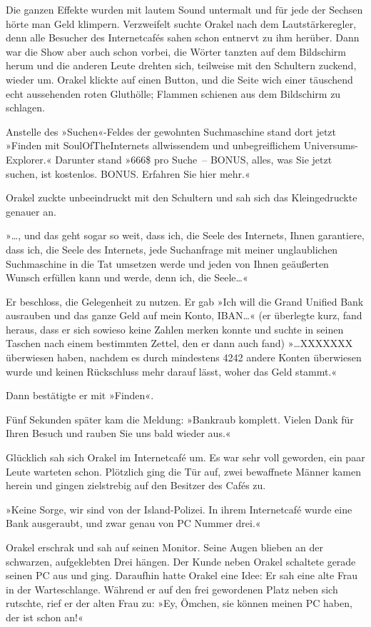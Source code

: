 Die ganzen Effekte wurden mit lautem Sound untermalt und für jede der Sechsen hörte man Geld klimpern. Verzweifelt suchte Orakel nach dem Lautstärkeregler, denn alle Besucher des Internetcafés sahen schon entnervt zu ihm herüber. Dann war die Show aber auch schon vorbei, die Wörter tanzten auf dem Bildschirm herum und die anderen Leute drehten sich, teilweise mit den Schultern zuckend, wieder um. Orakel klickte auf einen Button, und die Seite wich einer täuschend echt aussehenden roten Gluthölle; Flammen schienen aus dem Bildschirm zu schlagen.

Anstelle des »Suchen«-Feldes der gewohnten Suchmaschine stand dort jetzt »Finden mit SoulOfTheInternets allwissendem und unbegreiflichem Universums-Explorer.« Darunter stand »666\$ pro Suche~– BONUS, alles, was Sie jetzt suchen, ist kostenlos. BONUS. Erfahren Sie hier mehr.«

Orakel zuckte unbeeindruckt mit den Schultern und sah sich das Kleingedruckte genauer an.

»…, und das geht sogar so weit, dass ich, die Seele des Internets, Ihnen garantiere, dass ich, die Seele des Internets, jede Suchanfrage mit meiner unglaublichen Suchmaschine in die Tat umsetzen werde und jeden von Ihnen geäußerten Wunsch erfüllen kann und werde, denn ich, die Seele…«

Er beschloss, die Gelegenheit zu nutzen. Er gab »Ich will die Grand Unified Bank ausrauben und das ganze Geld auf mein Konto, IBAN…« (er überlegte kurz, fand heraus, dass er sich sowieso keine Zahlen merken konnte und suchte in seinen Taschen nach einem bestimmten Zettel, den er dann auch fand) »…XXXXXXX überwiesen haben, nachdem es durch mindestens 4242 andere Konten überwiesen wurde und keinen Rückschluss mehr darauf lässt, woher das Geld stammt.«

Dann bestätigte er mit »Finden«.

Fünf Sekunden später kam die Meldung: »Bankraub komplett. Vielen Dank für Ihren Besuch und rauben Sie uns bald wieder aus.«

Glücklich sah sich Orakel im Internetcafé um. Es war sehr voll geworden, ein paar Leute warteten schon. Plötzlich ging die Tür auf, zwei bewaffnete Männer kamen herein und gingen zielstrebig auf den Besitzer des Cafés zu.

»Keine Sorge, wir sind von der Island-Polizei. In ihrem Internetcafé wurde eine Bank ausgeraubt, und zwar genau von PC Nummer drei.«

Orakel erschrak und sah auf seinen Monitor. Seine Augen blieben an der schwarzen, aufgeklebten Drei hängen. Der Kunde neben Orakel schaltete gerade seinen PC aus und ging. Daraufhin hatte Orakel eine Idee: Er sah eine alte Frau in der Warteschlange. Während er auf den frei gewordenen Platz neben sich rutschte, rief er der alten Frau zu: »Ey, Ömchen, sie können meinen PC haben, der ist schon an!«

